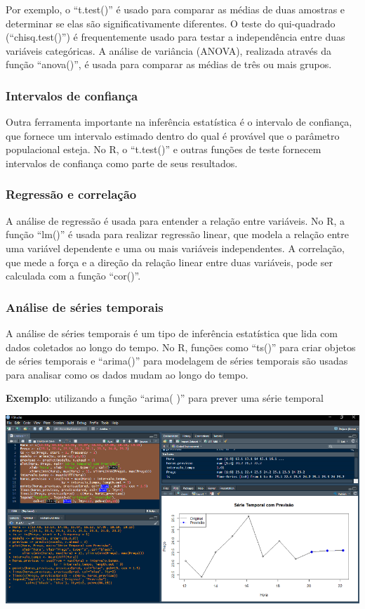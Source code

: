 \documentclass[
]{book}
\begin{document}
Por exemplo, o ``t.test()'' é usado para comparar as médias de duas amostras e determinar se elas são significativamente diferentes. O teste do qui-quadrado (``chisq.test()'') é frequentemente usado para testar a independência entre duas variáveis categóricas. A análise de variância (ANOVA), realizada através da função ``anova()'', é usada para comparar as médias de três ou mais grupos.

\subsubsection{Intervalos de confiança}\label{intervalos-de-confianuxe7a}

Outra ferramenta importante na inferência estatística é o intervalo de confiança, que fornece um intervalo estimado dentro do qual é provável que o parâmetro populacional esteja. No R, o ``t.test()'' e outras funções de teste fornecem intervalos de confiança como parte de seus resultados.

\subsubsection{Regressão e correlação}\label{regressuxe3o-e-correlauxe7uxe3o}

A análise de regressão é usada para entender a relação entre variáveis. No R, a função ``lm()'' é usada para realizar regressão linear, que modela a relação entre uma variável dependente e uma ou mais variáveis independentes. A correlação, que mede a força e a direção da relação linear entre duas variáveis, pode ser calculada com a função ``cor()''.

\subsubsection{Análise de séries temporais}\label{anuxe1lise-de-suxe9ries-temporais}

A análise de séries temporais é um tipo de inferência estatística que lida com dados coletados ao longo do tempo. No R, funções como ``ts()'' para criar objetos de séries temporais e ``arima()'' para modelagem de séries temporais são usadas para analisar como os dados mudam ao longo do tempo.

\textbf{Exemplo}: utilizando a função ``arima( )'' para prever uma série temporal

\includegraphics{images/clipboard-3461101962.png}
\end{document}
